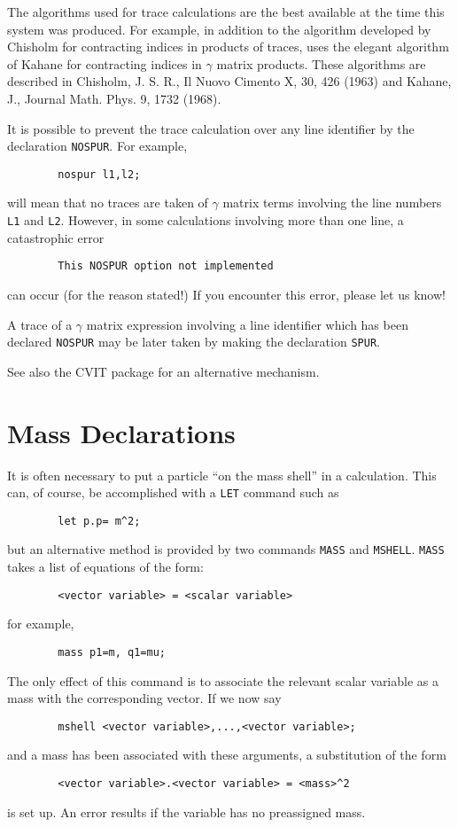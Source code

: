 The algorithms used for trace calculations are the best available at the
time this system was produced. For example, in addition to the algorithm
developed by Chisholm for contracting indices in products of traces,
{\REDUCE} uses the elegant algorithm of Kahane for contracting indices in
$\gamma$ matrix products.  These algorithms are described in Chisholm, J. S.
R., Il Nuovo Cimento X, 30, 426 (1963) and Kahane, J., Journal Math.
Phys. 9, 1732 (1968).

It is possible to prevent the trace calculation over any line identifier
by the declaration {\tt NOSPUR}.  For example,
\begin{verbatim}
        nospur l1,l2;
\end{verbatim}
will mean that no traces are taken of $\gamma$ matrix terms involving the line
numbers {\tt L1} and {\tt L2}.  However, in some calculations involving
more than one line, a catastrophic error
\begin{verbatim}
        This NOSPUR option not implemented
\end{verbatim}
can occur (for the reason stated!) If you encounter this error, please let
us know!

A trace of a $\gamma$ matrix expression involving a line identifier which has
been declared {\tt NOSPUR} may be later taken by making the declaration
{\tt SPUR}.

See also the CVIT package for an alternative mechanism.

\section{Mass Declarations}

It is often necessary to put a particle ``on the mass shell'' in a
calculation.  This can, of course, be accomplished with a {\tt LET}
command such as
\begin{verbatim}
        let p.p= m^2;
\end{verbatim}
but an alternative method is provided by two commands {\tt MASS} and
{\tt MSHELL}.
{\tt MASS} takes a list of equations of the form:
\begin{verbatim}
        <vector variable> = <scalar variable>
\end{verbatim}
for example,
\begin{verbatim}
        mass p1=m, q1=mu;
\end{verbatim}
The only effect of this command is to associate the relevant scalar
variable as a mass with the corresponding vector. If we now say
\begin{verbatim}
        mshell <vector variable>,...,<vector variable>;
\end{verbatim}
and a mass has been associated with these arguments, a substitution of the
form
\begin{verbatim}
        <vector variable>.<vector variable> = <mass>^2
\end{verbatim}
is set up. An error results if the variable has no preassigned mass.

